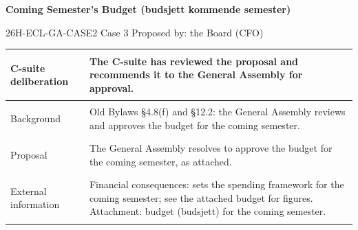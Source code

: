 \documentclass{../../../Common/Latex/Templates/rapport}
\begin{document}
\reportmainmatter
\small
\setlength{\parindent}{0pt}
\setlength{\tabcolsep}{6pt}
\renewcommand{\arraystretch}{1.2}

\begin{center}
  {\Large\bfseries Coming Semester's Budget (budsjett kommende semester)}\par
  \vspace{0.15cm}
  {\normalsize 26H-ECL-GA-CASE2 \textperiodcentered{} Case 3 \textperiodcentered{} Proposed by: the Board (CFO)}\par
  \vspace{0.1cm}
  {\small \meetingline}\par
\end{center}

\vspace{0.3cm}
\begin{tabularx}{\textwidth}{|>{\bfseries\raggedright\arraybackslash}p{4.2cm}|X|}
  \hline
  C-suite deliberation & The C-suite has reviewed the proposal and recommends it to the General Assembly for approval. \\
  \hline
  Background           & Old Bylaws \S4.8(f) and \S12.2: the General Assembly reviews and approves the budget for the coming semester. \\
  \hline
  Proposal             & The General Assembly resolves to approve the budget for the coming semester, as attached. \\
  \hline
  External information & Financial consequences: sets the spending framework for the coming semester; see the attached budget for figures. Attachment: budget (budsjett) for the coming semester. \\
  \hline
\end{tabularx}
\end{document}
